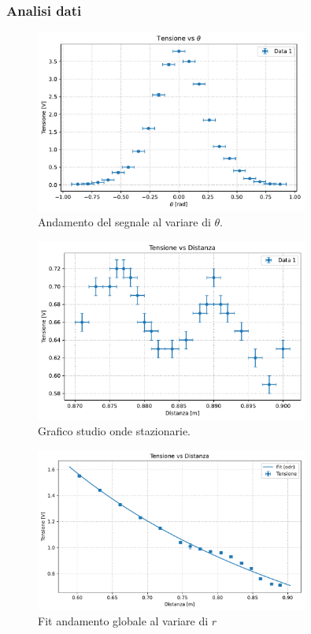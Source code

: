 \documentclass[a4paper]{article}
\begin{document}
\subsubsection{Analisi dati}
\begin{figure}[htbp]
	\centering
	\includegraphics[width=0.8\textwidth]{grafici/theta_qualitativo.pdf}
	\caption{Andamento del segnale al variare di $\theta$.}
	\label{fig:theta_qualitativo}
\end{figure}
\begin{figure}[htbp]
	\centering
	\includegraphics[width=0.8\textwidth]{grafici/distanza_onde_stazionarie.pdf}
	\caption{Grafico studio onde stazionarie.}
	\label{fig:onde_stazionarie}
\end{figure}
\begin{figure}[htbp]
	\centering
	\includegraphics[width=0.8\textwidth]{grafici/distanza_massimi.pdf}
	\caption{Fit andamento globale al variare di $r$}
	\label{fig:distanza_massimi}
\end{figure}
\end{document}
